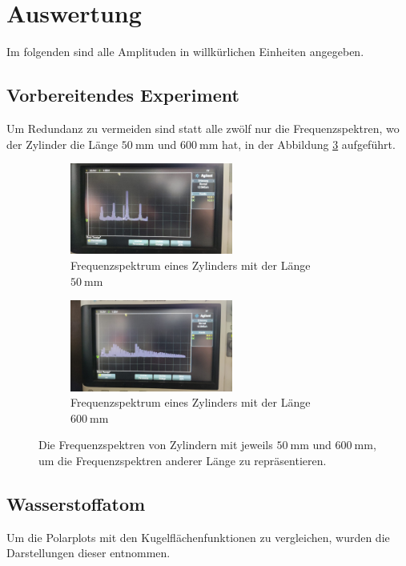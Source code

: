 \section{Auswertung}
\label{sec:Auswertung}
Im folgenden sind alle Amplituden in willkürlichen Einheiten angegeben.
\subsection{Vorbereitendes Experiment}
Um Redundanz zu vermeiden sind statt alle zwölf nur die Frequenzspektren, wo der Zylinder die Länge $\qty{50}{\milli\meter}$ und $\qty{600}{\milli\meter}$ hat, in der Abbildung
\ref{fig:os} aufgeführt.
\begin{figure}
\begin{subfigure}{0.48\textwidth}%
\centering%
\includegraphics[height=3cm]{data_scripts/1.jpeg}%
\caption{Frequenzspektrum eines Zylinders mit der Länge $\qty{50}{\milli\meter}$}%
\label{fig:50os}%
\end{subfigure}%
\hfill%
\begin{subfigure}{0.48\textwidth}%
\centering%
\includegraphics[height=3cm]{data_scripts/12.jpeg}%
\caption{Frequenzspektrum eines Zylinders mit der Länge $\qty{600}{\milli\meter}$}%
\label{fig:600os}%
\end{subfigure}%
\caption{Die Frequenzspektren von Zylindern mit jeweils $\qty{50}{\milli\meter}$ und $\qty{600}{\milli\meter}$, um die Frequenzspektren anderer Länge zu repräsentieren.}%
\label{fig:os}%
\end{figure}%


\subsection{Wasserstoffatom}
Um die Polarplots mit den Kugelflächenfunktionen zu vergleichen, wurden die Darstellungen dieser \cite{sphericalharmonics} entnommen.


